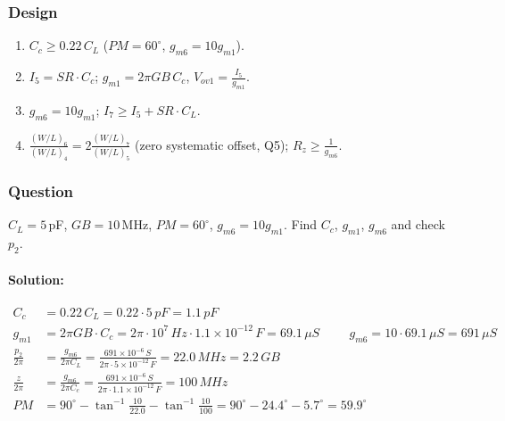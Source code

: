 \subsubsection{Design}
\begin{enumerate}
  \item \(C_c \geq 0.22\,C_L\) (\(PM = 60^\circ\), \(g_{m6} = 10 g_{m1}\)).
  \item \(I_5 = SR \cdot C_c\); \(g_{m1} = 2\pi GB\, C_c\), \(V_{ov1} = \frac{I_5}{g_{m1}}\).
  \item \(g_{m6} = 10 g_{m1}\); \(I_7 \geq I_5 + SR \cdot C_L\).
  \item \(\frac{(W/L)_6}{(W/L)_4} = 2\frac{(W/L)_7}{(W/L)_5}\) (zero systematic offset, Q5); \(R_z \geq \frac{1}{g_{m6}}\).
\end{enumerate}

\subsubsection{Question}
\(C_L = 5\,\)pF, \(GB = 10\,\)MHz, \(PM = 60^\circ\), \(g_{m6} = 10 g_{m1}\).
Find \(C_c\), \(g_{m1}\), \(g_{m6}\) and check \(p_2\).
\paragraph{Solution:}
\begin{align*}
  C_c &= 0.22\, C_L = 0.22 \cdot 5\,pF = 1.1\,pF \\
  g_{m1} &= 2\pi GB \cdot C_c = 2\pi \cdot 10^{7}\,Hz \cdot 1.1 \times 10^{-12}\,F = 69.1\,\mu S \hspace{1cm}
  g_{m6} = 10 \cdot 69.1\,\mu S = 691\,\mu S \\
  \frac{p_2}{2\pi} &= \frac{g_{m6}}{2\pi C_L} = \frac{691 \times 10^{-6}\,S}{2\pi \cdot 5 \times 10^{-12}\,F} = 22.0\,MHz = 2.2\,GB \\
  \frac{z}{2\pi} &= \frac{g_{m6}}{2\pi C_c} = \frac{691 \times 10^{-6}\,S}{2\pi \cdot 1.1 \times 10^{-12}\,F} = 100\,MHz \\
  PM &= 90^\circ - \tan^{-1}\frac{10}{22.0} - \tan^{-1}\frac{10}{100} = 90^\circ - 24.4^\circ - 5.7^\circ = 59.9^\circ
\end{align*}

